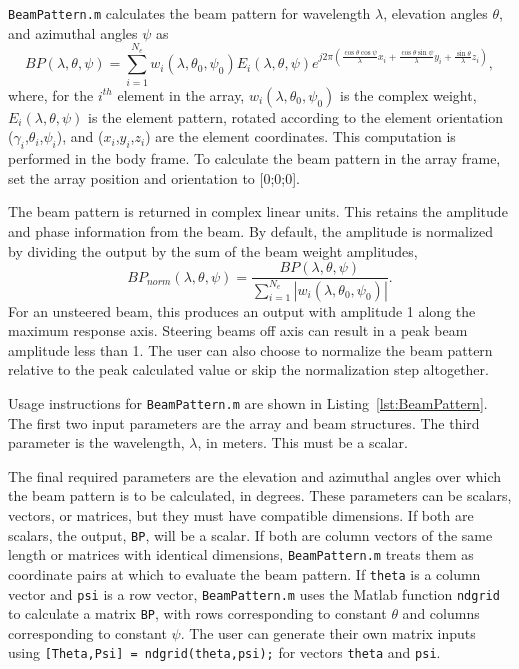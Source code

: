 \texttt{BeamPattern.m} calculates the beam pattern for wavelength $\lambda$, elevation angles $\theta$, and azimuthal angles $\psi$ as
\begin{equation}
BP(\lambda,\theta,\psi) = \sum_{i=1}^{N_e} w_i(\lambda,\theta_0,\psi_0)E_i(\lambda,\theta,\psi)e^{j2\pi\left(\frac{\cos\theta\cos\psi}{\lambda}x_i + \frac{\cos\theta\sin\psi}{\lambda}y_i + \frac{\sin\theta}{\lambda}z_i\right)},
\end{equation}
where, for the $i^{th}$ element in the array, $w_i(\lambda,\theta_0,\psi_0)$ is the complex weight, $E_i(\lambda,\theta,\psi)$ is the element pattern, rotated according to the element orientation ($\gamma_i$,$\theta_i$,$\psi_i$), and ($x_i$,$y_i$,$z_i$) are the element coordinates. This computation is performed in the body frame. To calculate the beam pattern in the array frame, set the array position and orientation to [0;0;0].

The beam pattern is returned in complex linear units. This retains the amplitude and phase information from the beam. By default, the amplitude is normalized by dividing the output by the sum of the beam weight amplitudes,
\begin{equation}
BP_{norm}(\lambda,\theta,\psi) = \frac{BP(\lambda,\theta,\psi)}{\sum_{i=1}^{N_e}|w_i(\lambda,\theta_0,\psi_0)|}.
\end{equation}
For an unsteered beam, this produces an output with amplitude 1 along the maximum response axis. Steering beams off axis can result in a peak beam amplitude less than 1. The user can also choose to normalize the beam pattern relative to the peak calculated value or skip the normalization step altogether.

Usage instructions for \texttt{BeamPattern.m} are shown in Listing~\ref{lst:BeamPattern}. The first two input parameters are the array and beam structures. The third parameter is the wavelength, $\lambda$, in meters. This must be a scalar. 

The final required parameters are the elevation and azimuthal angles over which the beam pattern is to be calculated, in degrees. These parameters can be scalars, vectors, or matrices, but they must have compatible dimensions. If both are scalars, the output, \texttt{BP}, will be a scalar. If both are column vectors of the same length or matrices with identical dimensions, \texttt{BeamPattern.m} treats them as coordinate pairs at which to evaluate the beam pattern. If \texttt{theta} is a column vector and \texttt{psi} is a row vector, \texttt{BeamPattern.m} uses the Matlab function \texttt{ndgrid} to calculate a matrix \texttt{BP}, with rows corresponding to constant $\theta$ and columns corresponding to constant $\psi$. The user can generate their own matrix inputs using \texttt{[Theta,Psi] = ndgrid(theta,psi);} for vectors \texttt{theta} and \texttt{psi}.

